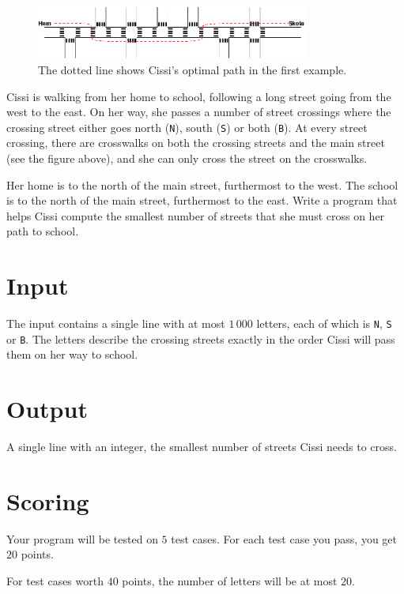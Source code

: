 
\begin{figure}[!h]
\begin{center}
\includegraphics[width=0.8\textwidth]{skolvag.png}
\end{center}
\caption{The dotted line shows Cissi's optimal path in the first example.}
\end{figure}

\noindent
Cissi is walking from her home to school, following a long street going from the west to the east.
On her way, she passes a number of street crossings where the crossing street either goes north (\texttt{N}), south (\texttt{S}) or both (\texttt{B}).
At every street crossing, there are crosswalks on both the crossing streets and the main street (see the figure above), and she can only cross the street on the crosswalks.

Her home is to the north of the main street, furthermost to the west.
The school is to the north of the main street, furthermost to the east.
Write a program that helps Cissi compute the smallest number of streets that she must cross on her path to school.

\section*{Input}
The input contains a single line with at most $1\,000$ letters, each of which is {\tt N}, {\tt S} or {\tt B}.
The letters describe the crossing streets exactly in the order Cissi will pass them on her way to school.

\section*{Output}
A single line with an integer, the smallest number of streets Cissi needs to cross.

\section*{Scoring}
Your program will be tested on $5$ test cases.
For each test case you pass, you get $20$ points.

For test cases worth $40$ points, the number of letters will be at most $20$.
